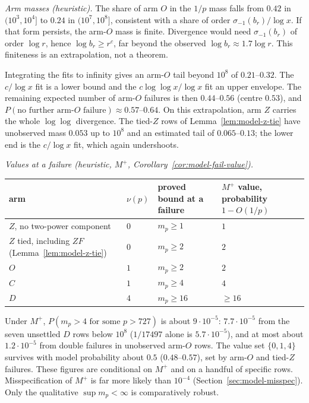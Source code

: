 \emph{Arm masses (heuristic).}  The share of arm $O$ in the $1/p$ mass falls
from $0.42$ in $(10^3,10^4]$ to $0.24$ in $(10^7,10^8]$, consistent with a
share of order $\sigma_{-1}(b_r)/\log x$.  If that form persists, the arm-$O$
mass is finite.  Divergence would need $\sigma_{-1}(b_r)$ of order $\log r$,
hence $\log b_r\geq r^{c}$, far beyond the observed $\log b_r\approx1.7\log r$.
This finiteness is an extrapolation, not a theorem.

Integrating the fits to infinity gives an arm-$O$ tail beyond $10^8$ of
$0.21$--$0.32$.  The $c/\log x$ fit is a lower bound and the
$c\log\log x/\log x$ fit an upper envelope.  The remaining expected number
of arm-$O$ failures is then $0.44$--$0.56$ (centre $0.53$), and
$P(\text{no further arm-}O\text{ failure})\approx0.57$--$0.64$.  On this
extrapolation, arm $Z$ carries the whole $\log\log$ divergence.  The tied-$Z$
rows of Lemma~\ref{lem:model-z-tie} have unobserved mass $0.053$ up to $10^8$
and an estimated tail of $0.065$--$0.13$; the lower end is the $c/\log x$ fit,
which again undershoots.

\emph{Values at a failure (heuristic, $M^+$, Corollary~\ref{cor:model-fail-value}).}
\begin{center}
\small
\begin{tabular}{llll}
\hline
arm & $\nu(p)$ & proved bound at a failure & $M^+$ value, probability $1-O(1/p)$\\
\hline
$Z$, no two-power component & $0$ & $m_p\geq1$ & $1$\\
$Z$ tied, including $ZF$ (Lemma~\ref{lem:model-z-tie}) & $0$ & $m_p\geq2$ & $2$\\
$O$ & $1$ & $m_p\geq2$ & $2$\\
$C$ & $1$ & $m_p\geq4$ & $4$\\
$D$ & $4$ & $m_p\geq16$ & $\geq16$\\
\hline
\end{tabular}
\end{center}
Under $M^+$, $P(m_p>4\text{ for some }p>727)$ is about $9\cdot10^{-5}$:
$7.7\cdot10^{-5}$ from the seven unsettled $D$ rows below $10^8$
($1/17497$ alone is $5.7\cdot10^{-5}$), and at most about $1.2\cdot10^{-5}$
from double failures in unobserved arm-$O$ rows.  The value set $\{0,1,4\}$
survives with model probability about $0.5$ ($0.48$--$0.57$), set by arm-$O$
and tied-$Z$ failures.  These figures are conditional on $M^+$ and on a
handful of specific rows.  Misspecification of $M^+$ is far more likely than
$10^{-4}$ (Section~\ref{sec:model-misspec}).  Only the qualitative
$\sup m_p<\infty$ is comparatively robust.

